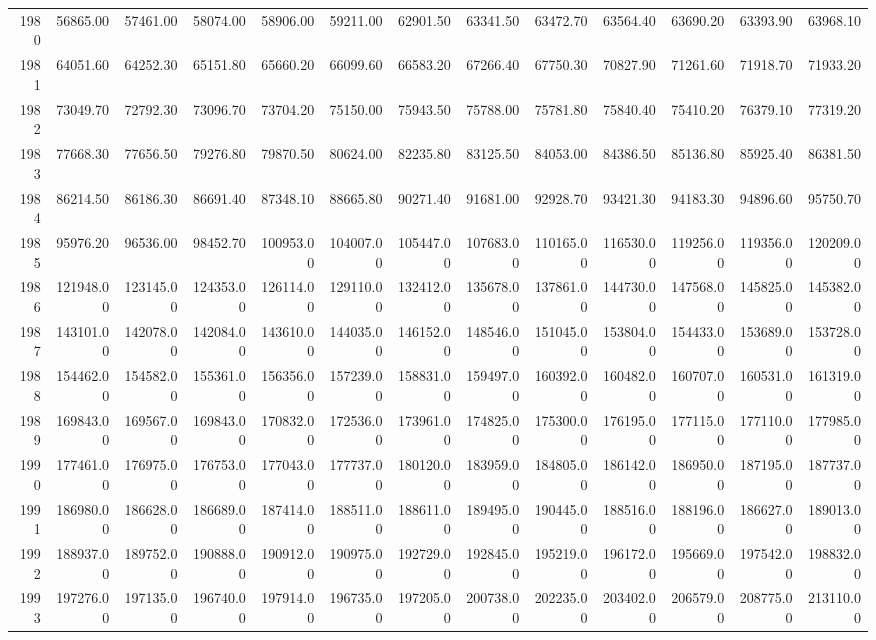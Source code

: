 \begin{longtable}{rrrrrrrrrrrrr}
  1980 & 56865.00 & 57461.00 & 58074.00 & 58906.00 & 59211.00 & 62901.50 & 63341.50 & 63472.70 & 63564.40 & 63690.20 & 63393.90 & 63968.10 \\ 
  1981 & 64051.60 & 64252.30 & 65151.80 & 65660.20 & 66099.60 & 66583.20 & 67266.40 & 67750.30 & 70827.90 & 71261.60 & 71918.70 & 71933.20 \\ 
  1982 & 73049.70 & 72792.30 & 73096.70 & 73704.20 & 75150.00 & 75943.50 & 75788.00 & 75781.80 & 75840.40 & 75410.20 & 76379.10 & 77319.20 \\ 
  1983 & 77668.30 & 77656.50 & 79276.80 & 79870.50 & 80624.00 & 82235.80 & 83125.50 & 84053.00 & 84386.50 & 85136.80 & 85925.40 & 86381.50 \\ 
  1984 & 86214.50 & 86186.30 & 86691.40 & 87348.10 & 88665.80 & 90271.40 & 91681.00 & 92928.70 & 93421.30 & 94183.30 & 94896.60 & 95750.70 \\ 
  1985 & 95976.20 & 96536.00 & 98452.70 & 100953.00 & 104007.00 & 105447.00 & 107683.00 & 110165.00 & 116530.00 & 119256.00 & 119356.00 & 120209.00 \\ 
  1986 & 121948.00 & 123145.00 & 124353.00 & 126114.00 & 129110.00 & 132412.00 & 135678.00 & 137861.00 & 144730.00 & 147568.00 & 145825.00 & 145382.00 \\ 
  1987 & 143101.00 & 142078.00 & 142084.00 & 143610.00 & 144035.00 & 146152.00 & 148546.00 & 151045.00 & 153804.00 & 154433.00 & 153689.00 & 153728.00 \\ 
  1988 & 154462.00 & 154582.00 & 155361.00 & 156356.00 & 157239.00 & 158831.00 & 159497.00 & 160392.00 & 160482.00 & 160707.00 & 160531.00 & 161319.00 \\ 
  1989 & 169843.00 & 169567.00 & 169843.00 & 170832.00 & 172536.00 & 173961.00 & 174825.00 & 175300.00 & 176195.00 & 177115.00 & 177110.00 & 177985.00 \\ 
  1990 & 177461.00 & 176975.00 & 176753.00 & 177043.00 & 177737.00 & 180120.00 & 183959.00 & 184805.00 & 186142.00 & 186950.00 & 187195.00 & 187737.00 \\ 
  1991 & 186980.00 & 186628.00 & 186689.00 & 187414.00 & 188511.00 & 188611.00 & 189495.00 & 190445.00 & 188516.00 & 188196.00 & 186627.00 & 189013.00 \\ 
  1992 & 188937.00 & 189752.00 & 190888.00 & 190912.00 & 190975.00 & 192729.00 & 192845.00 & 195219.00 & 196172.00 & 195669.00 & 197542.00 & 198832.00 \\ 
  1993 & 197276.00 & 197135.00 & 196740.00 & 197914.00 & 196735.00 & 197205.00 & 200738.00 & 202235.00 & 203402.00 & 206579.00 & 208775.00 & 213110.00 \\ 

\end{longtable}
